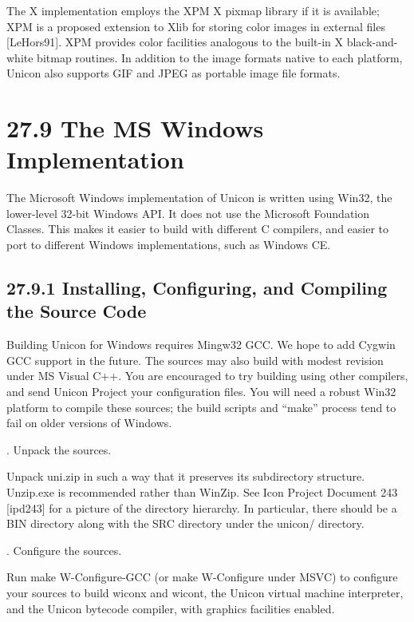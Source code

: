 The X implementation employs the XPM X pixmap library if it is
available; XPM is a proposed extension to Xlib for storing color
images in external files [LeHors91]. XPM provides color facilities
analogous to the built-in X black-and-white bitmap routines. In
addition to the image formats native to each platform, Unicon also
supports GIF and JPEG as portable image file formats.

\section[27.9 The MS Windows Implementation]{27.9 The MS Windows Implementation}

The Microsoft Windows implementation of Unicon is written using Win32,
the lower-level 32-bit Windows API. It does not use the Microsoft
Foundation Classes. This makes it easier to build with different C
compilers, and easier to port to different Windows implementations,
such as Windows CE.

\subsection[27.9.1 Installing, Configuring, and Compiling the Source Code]{27.9.1 Installing, Configuring, and Compiling the Source Code}

Building Unicon for Windows requires Mingw32 GCC. We hope to add
Cygwin GCC support in the future. The sources may also build with
modest revision under MS Visual C++. You are encouraged to try
building using other compilers, and send Unicon Project your
configuration files. You will need a robust Win32 platform to compile
these sources; the build scripts and ``make'' process tend to fail on
older versions of Windows.

{. Unpack the sources.}

Unpack uni.zip in such a way that it preserves its subdirectory
structure. Unzip.exe is recommended rather than WinZip.  See Icon
Project Document 243 [ipd243] for a picture of the directory
hierarchy. In particular, there should be a BIN directory along with
the SRC directory under the unicon/ directory.

{. Configure the sources.}


Run {\textquotedbl}make W-Configure-GCC{\textquotedbl} (or
{\textquotedbl}make W-Configure{\textquotedbl} under MSVC) to
configure your sources to build wiconx and wicont, the Unicon virtual
machine interpreter, and the Unicon bytecode compiler, with graphics
facilities enabled.

